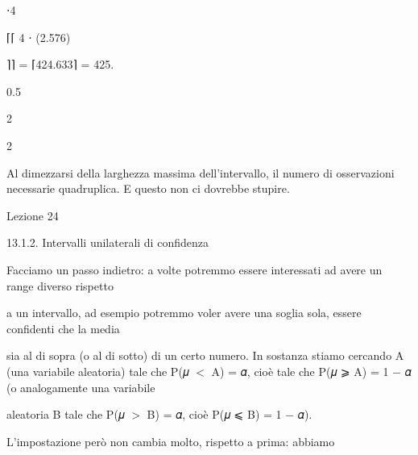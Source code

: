 \documentclass[a4paper,portrait,12pt]{article}
\begin{document}
⋅4


⌈⌈ 4 ⋅ (2.576)


⌉⌉ = ⌈424.633⌉ = 425.


0.5


2





2





\begin{flushleft}
Al dimezzarsi della larghezza massima dell'intervallo, il numero di osservazioni necessarie quadruplica. E questo non ci dovrebbe stupire.
\end{flushleft}


\begin{flushleft}
Lezione 24
\end{flushleft}





\begin{flushleft}
13.1.2. Intervalli unilaterali di confidenza
\end{flushleft}


\begin{flushleft}
Facciamo un passo indietro: a volte potremmo essere interessati ad avere un range diverso rispetto
\end{flushleft}


\begin{flushleft}
a un intervallo, ad esempio potremmo voler avere una soglia sola, essere confidenti che la media
\end{flushleft}


\begin{flushleft}
sia al di sopra (o al di sotto) di un certo numero. In sostanza stiamo cercando A (una variabile aleatoria) tale che P(𝜇 $<$ A) = 𝛼, cio\`{e} tale che P(𝜇 ⩾ A) = 1 $-$ 𝛼 (o analogamente una variabile
\end{flushleft}


\begin{flushleft}
aleatoria B tale che P(𝜇 $>$ B) = 𝛼, cio\`{e} P(𝜇 ⩽ B) = 1 $-$ 𝛼).
\end{flushleft}


\begin{flushleft}
L'impostazione per\`{o} non cambia molto, rispetto a prima: abbiamo
\end{flushleft}
\end{document}
